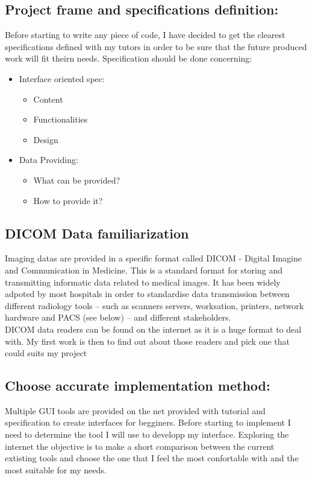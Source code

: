 \documentclass[12pt,twoside]{article}
\begin{document}
\subsection{Project frame and specifications definition:}
Before starting to write any piece of code, I have decided to get the clearest specifications defined with my tutors in order to be sure that the future produced work will fit theirn needs. Specification should be done concerning:
\begin{itemize}
\item Interface oriented spec:
\begin{itemize}
\item Content
\item Functionalities
\item Design
\end{itemize}

\item Data Providing:
\begin{itemize} 
\item What can be provided?
\item How to provide it?
\end{itemize}

	
\end{itemize}


\subsection{DICOM Data familiarization}
Imaging datas are provided in a specific format called DICOM - Digital Imagine and Communication in Medicine. This is a standard format for storing and transmitting informatic data related to medical images. It has been widely adpoted by most hospitals in order to standardise data transmission between different radiology tools – such as scanners servers, worksation, printers, network hardware and PACS (see below) – and different stakeholders.  \\
DICOM data readers can be found on the internet as it is a huge format to deal with. My first work is then to find out about those readers and pick one that could suits my project 
 

\subsection{Choose accurate implementation method:}
Multiple GUI tools are provided on the net provided with tutorial and specification to create interfaces for begginers. Before starting to implement I need to determine the tool I will use to developp my interface. Exploring the internet the objective is to make a short comparison between the current extisting tools and choose the one that I feel the most confortable with and the most suitable for my needs.
\end{document}
